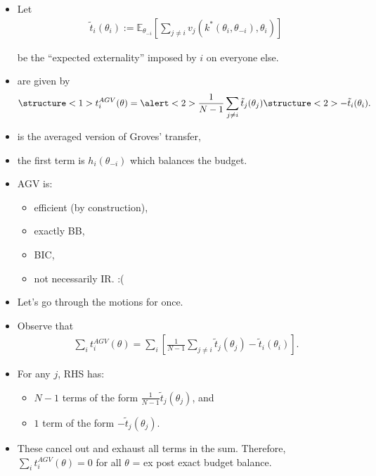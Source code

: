 \documentclass[english]{beamer}		%
\def\lyxframeend{} %
\begin{document}
\begin{itemize}
	\item Let 
	\vspace{-0.5em}\begin{align*}
	\tilde{t}_i (\theta_i) := \mathbb{E}_{\theta_{-i}} \left[ \sum_{j \neq i} v_j (k^*(\theta_i,\theta_{-i}), \theta_i) \right]
	\end{align*}\vspace{-1em}
	
	be the ``expected externality'' imposed by $i$ on everyone else.
	\item {} are given by
	\vspace{-0.5em}\begin{align*}
	\structure<1>{t_i^{AGV} (\theta) = \alert<2>{\frac{1}{N-1} \sum_{j \neq i} \tilde{t}_j (\theta_j)} \structure<2>{- \tilde{t}_i (\theta_i)}}.
	\end{align*}\vspace{-1em}
	\pause
	\item {} is the averaged version of Groves' transfer,
	\item \alert{the first term} is $h_i(\theta_{-i})$ which balances the budget.
\end{itemize}
\lyxframeend


\begin{itemize}
	\item AGV is:
	\begin{itemize}
		\item efficient (by construction),
		\item exactly BB,
		\item BIC,
		\pause
		\item not necessarily IR. :(
	\end{itemize}
	\item Let's go through the motions for once.
\end{itemize}
\lyxframeend


\begin{itemize}
	\item Observe that
	\vspace{-0.5em}\begin{align*}
	\sum_i t_i^{AGV} (\theta) = \sum_i \left[ \frac{1}{N-1} \sum_{j \neq i} \tilde{t}_j (\theta_j) - \tilde{t}_i (\theta_i) \right].
	\end{align*}\vspace{-1em}
	\item For any $j$, RHS has:
	\begin{itemize}
		\item $N-1$ terms of the form $\frac{1}{N-1} \tilde{t}_j (\theta_j)$, and
		\item $1$ term of the form $-\tilde{t}_j(\theta_j)$.
	\end{itemize}
	\item These cancel out and exhaust all terms in the sum. Therefore, $\sum_i t_i^{AGV} (\theta) = 0$ for all $\theta$ = ex post exact budget balance.
\end{itemize}
\lyxframeend
\end{document}
